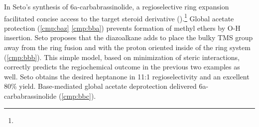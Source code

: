 In Seto's synthesis of 6a-carbabrassinolide, a regioselective ring expansion
facilitated concise access to the target steroid derivative
().\footnote{} Global acetate protection (\ref{cmp:baz} \ce{->} \ref{cmp:bba})
prevents formation of methyl ethers by O-H insertion. Seto proposes that the
diazoalkane adds to place the bulky TMS group away from the ring fusion and with
the proton oriented inside of the ring system (\ref{cmp:bbb}). This simple
model, based on minimization of steric interactions, correctly predicts the
regiochemical outcome in the previous two examples as well. Seto obtains the desired
heptanone in 11:1 regioselectivity and an excellent 80\% yield. Base-mediated
global acetate deprotection delivered 6a-carbabrassinolide (\ref{cmp:bbc}). 


